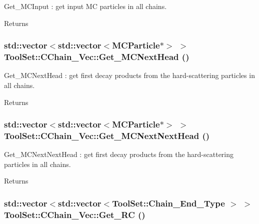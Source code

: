 Get\_\-MCInput : get input MC particles in all chains. \begin{DoxyReturn}{Returns}

\end{DoxyReturn}
\hypertarget{classToolSet_1_1CChain__Vec_a22c91bb1f15d6139b942e08920851aad}{
\subsubsection[{Get\_\-MCNextHead}]{\setlength{\rightskip}{0pt plus 5cm}std::vector$<$std::vector$<$MCParticle$\ast$$>$ $>$ ToolSet::CChain\_\-Vec::Get\_\-MCNextHead ()}}
\label{classToolSet_1_1CChain__Vec_a22c91bb1f15d6139b942e08920851aad}


Get\_\-MCNextHead : get first decay products from the hard-\/scattering particles in all chains. \begin{DoxyReturn}{Returns}

\end{DoxyReturn}
\hypertarget{classToolSet_1_1CChain__Vec_a2546469860c85e211a76a3ec8cbf0bf2}{
\subsubsection[{Get\_\-MCNextNextHead}]{\setlength{\rightskip}{0pt plus 5cm}std::vector$<$std::vector$<$MCParticle$\ast$$>$ $>$ ToolSet::CChain\_\-Vec::Get\_\-MCNextNextHead ()}}
\label{classToolSet_1_1CChain__Vec_a2546469860c85e211a76a3ec8cbf0bf2}


Get\_\-MCNextNextHead : get first decay products from the hard-\/scattering particles in all chains. \begin{DoxyReturn}{Returns}

\end{DoxyReturn}
\hypertarget{classToolSet_1_1CChain__Vec_a790838ea04f22624ad047e8e3f351db5}{
\subsubsection[{Get\_\-RC}]{\setlength{\rightskip}{0pt plus 5cm}std::vector$<$std::vector$<$ToolSet::Chain\_\-End\_\-Type $>$ $>$ ToolSet::CChain\_\-Vec::Get\_\-RC ()}}
\label{classToolSet_1_1CChain__Vec_a790838ea04f22624ad047e8e3f351db5}


